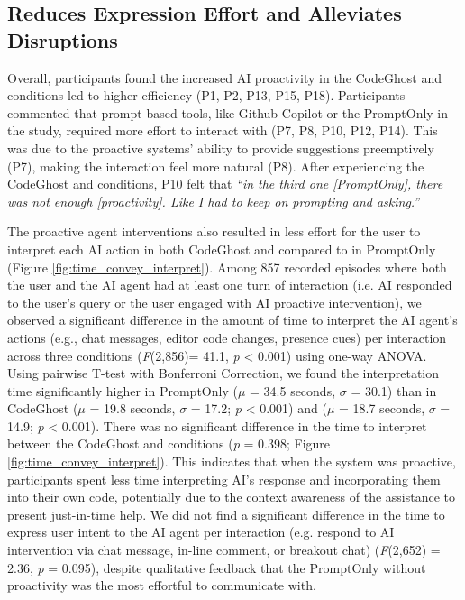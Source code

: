 \subsection{\sys{} Reduces Expression Effort and Alleviates Disruptions}
Overall, participants found the increased AI proactivity in the CodeGhost and \sys{} conditions led to higher efficiency (P1, P2, P13, P15, P18). 
Participants commented that prompt-based tools, like Github Copilot or the PromptOnly in the study, required more effort to interact with (P7, P8, P10, P12, P14).
This was due to the proactive systems' ability to provide suggestions preemptively (P7), making the interaction feel more natural (P8).
After experiencing the CodeGhost and \sys{} conditions, P10 felt that \textit{``in the third one [PromptOnly], there was not enough [proactivity]. Like I had to keep on prompting and asking.''}

The proactive agent interventions also resulted in less effort for the user to interpret each AI action in both CodeGhost and \sys{} compared to in PromptOnly (Figure \ref{fig:time_convey_interpret}). 
Among 857 recorded episodes where both the user and the AI agent had at least one turn of interaction (i.e. AI responded to the user's query or the user engaged with AI proactive intervention), we observed a significant difference in the amount of time to interpret the AI agent's actions (e.g., chat messages, editor code changes, presence cues) per interaction across three conditions (\textit{F}(2,856)= 41.1, \textit{p} < 0.001) using one-way ANOVA.
Using pairwise T-test with Bonferroni Correction, we found the interpretation time significantly higher in PromptOnly ($\mu$ = 34.5 seconds, $\sigma$ = 30.1) than in CodeGhost ($\mu$ = 19.8 seconds, $\sigma$ = 17.2; \textit{p} < 0.001) and \sys{} ($\mu$ = 18.7 seconds, $\sigma$ = 14.9; \textit{p} < 0.001). 
There was no significant difference in the time to interpret between the CodeGhost and \sys{} conditions (\textit{p} = 0.398; Figure \ref{fig:time_convey_interpret}). 
This indicates that when the system was proactive, participants spent less time interpreting AI's response and incorporating them into their own code, potentially due to the context awareness of the assistance to present just-in-time help.
We did not find a significant difference in the time to express user intent to the AI agent per interaction (e.g. respond to AI intervention via chat message, in-line comment, or breakout chat) (\textit{F}(2,652) = 2.36, \textit{p} = 0.095), despite qualitative feedback that the PromptOnly without proactivity was the most effortful to communicate with.


